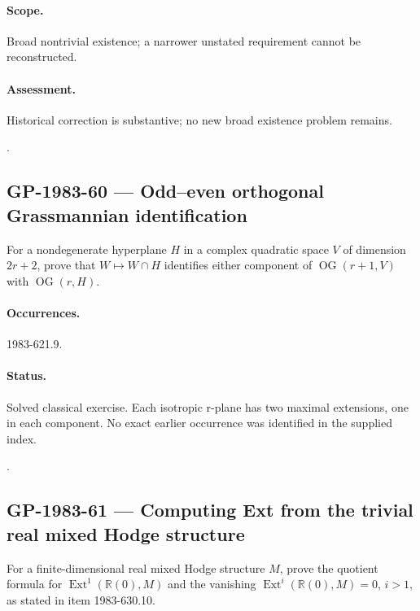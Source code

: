 \paragraph{Scope.} Broad nontrivial existence; a narrower unstated requirement cannot be reconstructed.

\paragraph{Assessment.} Historical correction is substantive; no new broad existence problem remains.

\noindent\citep{zamolodchikov1981tetrahedron,baxter1983tetrahedron,bazhanovsergeev2006tetrahedron}.

\subsection{GP-1983-60 --- Odd–even orthogonal Grassmannian identification}

\label{problem:GP-1983-60}

For a nondegenerate hyperplane \(H\) in a complex quadratic space \(V\) of dimension \(2r+2\), prove that \(W\mapsto W\cap H\) identifies either component of \(\operatorname{OG}(r+1,V)\) with \(\operatorname{OG}(r,H)\).

\paragraph{Occurrences.} 1983-621.9.

\paragraph{Status.} Solved classical exercise. Each isotropic r-plane has two maximal extensions, one in each component. No exact earlier occurrence was identified in the supplied index.

\noindent\citep{gelfandzelevinsky1984models}.

\subsection{GP-1983-61 --- Computing Ext from the trivial real mixed Hodge structure}

\label{problem:GP-1983-61}

For a finite-dimensional real mixed Hodge structure \(M\), prove the quotient formula for \(\operatorname{Ext}^1(\mathbb R(0),M)\) and the vanishing \(\operatorname{Ext}^i(\mathbb R(0),M)=0\), \(i>1\), as stated in item 1983-630.10.


